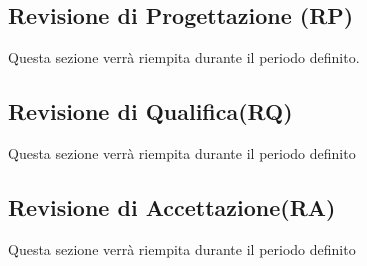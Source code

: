 \subsection{Revisione di Progettazione (RP)}
Questa sezione verrà riempita durante il periodo definito.
\subsection{Revisione di Qualifica(RQ)}
Questa sezione verrà riempita durante il periodo definito
\subsection{Revisione di Accettazione(RA)}
Questa sezione verrà riempita durante il periodo definito